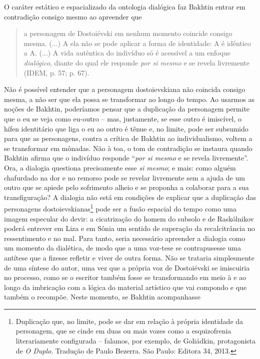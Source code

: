 O caráter estático e espacializado da ontologia dialógica faz Bakhtin
entrar em contradição consigo mesmo ao apreender que

\begin{quote}
a personagem de Dostoiévski em nenhum momento coincide consigo mesma.
(...) A ela não se pode aplicar a forma de identidade: A é idêntico a A.
(...) A vida autêntica do indivíduo só é acessível a um enfoque
\emph{dialógico}, diante do qual ele responde \emph{por si mesmo} e se
revela livremente (IDEM, p. 57; p. 67).
\end{quote}

Não é possível entender que a personagem dostoievskiana não coincida
consigo mesma, a não ser que ela possa se transformar ao longo do tempo.
Ao usarmos as noções de Bakhtin, poderíamos pensar que a duplicação da
personagem permite que o eu se veja como eu-outro -- mas, justamente, se
esse outro é imiscível, o hífen identitário que liga o eu ao outro é
tênue e, no limite, pode ser subsumido para que as personagens, contra a
crítica de Bakhtin ao individualismo, voltem a se transformar em
mônadas. Não à toa, o tom de contradição se instaura quando Bakhtin
afirma que o indivíduo responde ``\emph{por si mesmo} e se revela
livremente''. Ora, a dialogia questiona precisamente esse \emph{si
mesmo}; e mais: como alguém chafurdado na dor e no remorso pode se
revelar livremente sem a ajuda de um outro que se apiede pelo sofrimento
alheio e se proponha a colaborar para a sua transfiguração? A dialogia
não está em condições de explicar que a duplicação das personagens
dostoievskianas\footnote{Duplicação que, no limite, pode se dar em
  relação à própria identidade da personagem, que se cinde em duas ou
  mais vozes como a esquizofrenia literariamente configurada -- falamos,
  por exemplo, de Goliádkin, protagonista de \emph{O Duplo}. Tradução de
  Paulo Bezerra. São Paulo: Editora 34, 2013.} pode ser a fusão espacial
do tempo como uma imagem especular do devir: a cicatrização do homem do
subsolo e de Raskólnikov poderá entrever em Liza e em Sônia um sentido
de superação da recalcitrância no ressentimento e no mal. Para tanto,
seria necessário apreender a dialogia como um momento da dialética, de
modo que a uma voz-tese se contrapusesse uma antítese que a fizesse
refletir e viver de outra forma. Não se trataria simplesmente de uma
síntese do autor, uma vez que a própria voz de Dostoiévski se imiscuiria
no processo, como se o escritor também fosse se transformando em meio à
e ao longo da imbricação com a lógica do material artístico que vai
compondo e que também o recompõe. Neste momento, se Bakhtin acompanhasse
